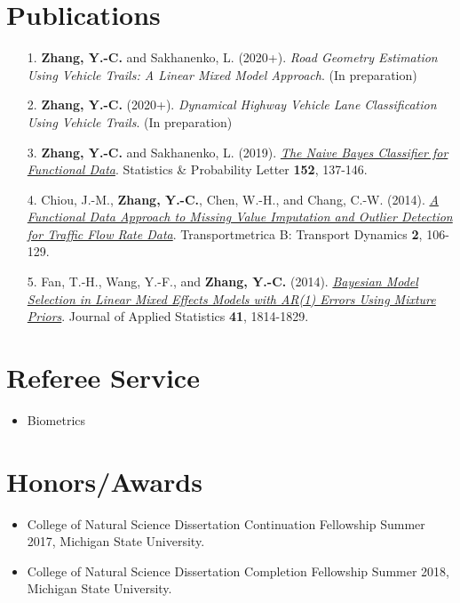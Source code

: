 \documentclass[a4paper,10pt,dvipdfmx]{article}
\begin{document}
\section*{Publications}
\begin{itemize}
  \item[1.] {\bf Zhang, Y.-C.} and Sakhanenko, L. (2020+). \textit{Road Geometry Estimation Using Vehicle Trails: A Linear Mixed Model Approach}. (In preparation)
  \item[2.] {\bf Zhang, Y.-C.} (2020+). \textit{Dynamical Highway Vehicle Lane Classification Using Vehicle Trails}. (In preparation)
  \item[3.] {\bf Zhang, Y.-C.} and Sakhanenko, L. (2019). \href{https://www.sciencedirect.com/science/article/pii/S0167715219301208}{\textit{The Naive Bayes Classifier for Functional Data}}. Statistics \& Probability Letter {\bf 152}, 137-146.
  \item[4.] Chiou, J.-M., {\bf Zhang, Y.-C.}, Chen, W.-H., and Chang, C.-W. (2014). \href{http://www.tandfonline.com/doi/abs/10.1080/21680566.2014.892847}{\textit{A Functional Data Approach to Missing Value Imputation and Outlier Detection for Traffic Flow Rate Data}}. Transportmetrica B: Transport Dynamics {\bf 2}, 106-129.
  \item[5.] Fan, T.-H., Wang, Y.-F., and {\bf Zhang, Y.-C.} (2014). \href{http://www.tandfonline.com/doi/abs/10.1080/02664763.2014.894001?journalCode=cjas20}{\textit{Bayesian Model Selection in Linear Mixed Effects Models with AR(1) Errors Using Mixture Priors}}. Journal of Applied Statistics {\bf 41}, 1814-1829.
\end{itemize}

\section*{Referee Service}
\begin{itemize}
  \item Biometrics
\end{itemize}

\section*{Honors/Awards}
\begin{itemize}
  \item College of Natural Science Dissertation Continuation Fellowship Summer 2017, Michigan State University.
  \item College of Natural Science Dissertation Completion Fellowship Summer 2018, Michigan State University.
\end{itemize}
\end{document}
